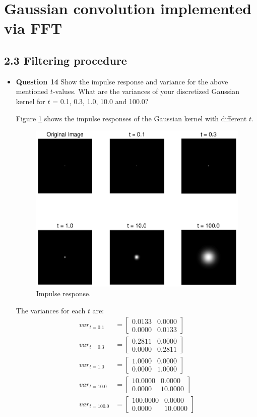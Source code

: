 \documentclass[11pt,a4paper]{article}
\begin{document}
\section{Gaussian convolution implemented via FFT}
\subsection*{2.3 Filtering procedure}
\begin{itemize}
	\item \textbf{Question 14} Show the impulse response and variance for the above mentioned $t$-values. What are the variances of your discretized Gaussian kernel for $t$ = 0.1, 0.3, 1.0, 10.0 and 100.0?
	\par Figure \ref{fig:Q14} shows the impulse responses of the Gaussian kernel with different $t$. 
	\begin{figure}[!ht]
		\footnotesize
		\centering 
		\includegraphics[width=0.8\columnwidth]{Q14.eps}
		\caption{Impulse response.}
		\label{fig:Q14}
	\end{figure}
	\par The variances for each $t$ are:
	\begin{align*}
	var_{t = 0.1} &= \begin{bmatrix} 0.0133 & 0.0000 \\ 0.0000 & 0.0133 \end{bmatrix} \\
	var_{t = 0.3} &= \begin{bmatrix} 0.2811 & 0.0000 \\ 0.0000 & 0.2811 \end{bmatrix} \\
	var_{t = 1.0} &= \begin{bmatrix} 1.0000 & 0.0000 \\ 0.0000 & 1.0000 \end{bmatrix} \\
	var_{t = 10.0} &= \begin{bmatrix} 10.0000 & 0.0000 \\ 0.0000 & 10.0000 \end{bmatrix} \\
	var_{t = 100.0} &= \begin{bmatrix} 100.0000 & 0.0000 \\ 0.0000 & 10.0000 \end{bmatrix}
	\end{align*}
	

\end{itemize}
\end{document}
